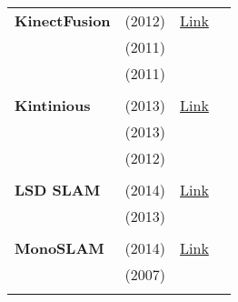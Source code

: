 \documentclass[a4paper,12pt]{scrartcl}
\begin{document}
{\begin{longtable}{l|l|l|l}
    \textbf{KinectFusion}  & \cite{Pirovano2012} (2012)        & {\href{https://github.com/PointCloudLibrary/pcl}{Link}}            &                       \\
                           & \cite{Izadi2011} (2011)           &                                                                    &                       \\
                           & \cite{Newcombe2011a} (2011)       &                                                                    &                       \\
                           &                                   &                                                                    &                       \\
    \textbf{Kintinious}    & \cite{Whelan2013a} (2013)         & {\href{https://github.com/mp3guy/Kintinuous}{Link}}                &                       \\
                           & \cite{Whelan2013} (2013)          &                                                                    &                       \\
                           & \cite{Whelan2012} (2012)          &                                                                    &                       \\
                           &                                   &                                                                    &                       \\
    \textbf{LSD SLAM}      & \cite{Engel2014} (2014)           & {\href{https://github.com/tum-vision/lsd_slam}{Link}}              &                       \\
                           & \cite{Engel2013} (2013)           &                                                                    &                       \\
                           &                                   &                                                                    &                       \\
    \textbf{MonoSLAM}      & \cite{Russo2014} (2014)           & {\href{https://github.com/rrg-polito/mono-slam}{Link}}             &                       \\
                           & \cite{Davison2007} (2007)         &                                                                    &                       \\
                           &                                   &                                                                    &                       \\

\end{longtable}}
\end{document}
